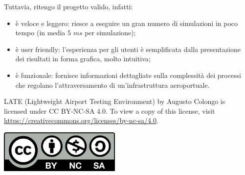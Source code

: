 \documentclass[a4paper, 12pt]{article}
\begin{document}
Tuttavia, ritengo il progetto valido, infatti: 
\begin{itemize}
\item è veloce e leggero: riesce a eseguire un gran numero di simulazioni in poco tempo (in media 5 $ms$ per simulazione);

\item è user friendly: l’esperienza per gli utenti è semplificata dalla presentazione dei risultati in forma grafica, molto intuitiva;

\item è funzionale: fornisce informazioni dettagliate sulla complessità dei processi che regolano l’attraversamento di un’infrastruttura aeroportuale.  
\end{itemize}
\newpage



\newpage
\vspace*{\fill}
LATE (Lightweight Airport Testing Environment) by Augusto Colongo is licensed under CC BY-NC-SA 4.0. To view a copy of this license, visit \url{https://creativecommons.org/licenses/by-nc-sa/4.0}.

\begin{center}
 \includegraphics[width=0.45\textwidth]{resources/images/CC-BY-NC-SA_icon.png}
\end{center}
\end{document}
